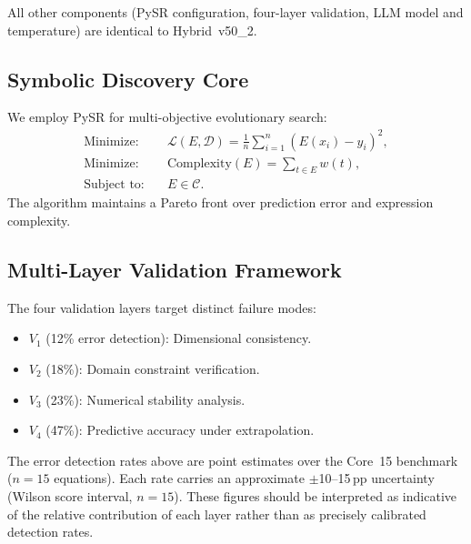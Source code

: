 \documentclass[twoside,11pt]{article}
\begin{document}
All other components (PySR configuration, four-layer validation, LLM model and
temperature) are identical to Hybrid~v50\_2.

\subsection{Symbolic Discovery Core}\label{subsec:symbolic-discovery-core}
\label{sec:arch_discovery}

We employ PySR \citep{cranmer2023pysr} for multi-objective evolutionary search:
\begin{align}
\text{Minimize:} \quad
& \mathcal{L}(E,\mathcal{D})
  = \frac{1}{n}\sum_{i=1}^n (E(x_i) - y_i)^2, \label{eq:loss}\\
\text{Minimize:} \quad
& \mathrm{Complexity}(E) = \sum_{t \in E} w(t), \label{eq:complexity}\\
\text{Subject to:} \quad
& E \in \mathcal{C}. \label{eq:constraints}
\end{align}
The algorithm maintains a Pareto front over prediction error and expression
complexity.

\subsection{Multi-Layer Validation Framework}\label{subsec:multilayer-validation-framework}
\label{sec:validation_detail}

The four validation layers target distinct failure modes:

\begin{itemize}
\item $V_1$ (12\% error detection): Dimensional consistency.
\item $V_2$ (18\%): Domain constraint verification.
\item $V_3$ (23\%): Numerical stability analysis.
\item $V_4$ (47\%): Predictive accuracy under extrapolation.
\end{itemize}

\begin{remark}
\label{rem:validation_ci}
The error detection rates above are point estimates over the Core~15 benchmark
($n=15$ equations).  Each rate carries an approximate $\pm$10--15\,pp
uncertainty (Wilson score interval, $n=15$).  These figures should be
interpreted as indicative of the relative contribution of each layer rather
than as precisely calibrated detection rates.
\end{remark}
\end{document}
